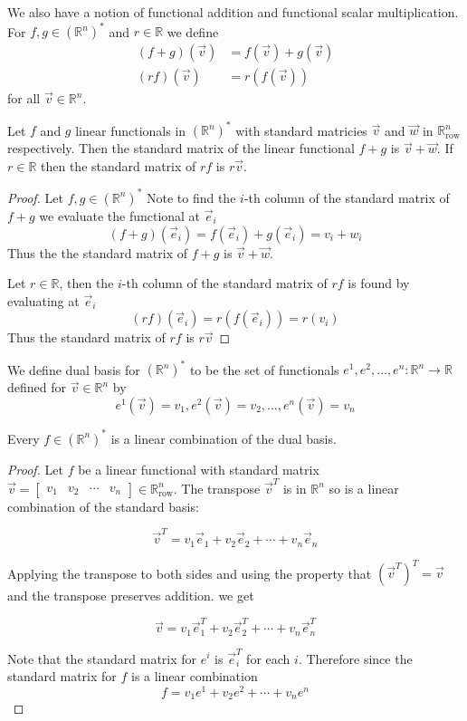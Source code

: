 \begin{definition}
We also have a notion of functional addition and functional scalar multiplication. For $f,g \in \left(\mathbb{R}^n\right)^*$ and $r \in \mathbb{R}$ we define
\begin{align*}
(f+g)(\vec{v})&=f(\vec{v})+g(\vec{v}) \\
(rf)(\vec{v})&=r(f(\vec{v}))
\end{align*}
for all $\vec{v} \in \mathbb{R}^n$.
\end{definition}

\begin{proposition}
Let $f$ and $g$ linear functionals in  $\left(\mathbb{R}^n\right)^*$ with standard matricies $\vec{v}$ and $\vec{w}$ in $\mathbb{R}^n_\text{row}$ respectively. Then 
the standard matrix of the linear functional $f+g$ is $\vec{v}+\vec{w}$. If $r \in \mathbb{R}$ then the standard matrix of $rf$ is $r\vec{v}$.
\end{proposition}
\begin{proof}
Let $f,g \in \left(\mathbb{R}^n\right)^*$
Note to find the $i$-th column of the standard matrix of $f+g$ we evaluate the functional at $\vec{e}_i$
\[
(f+g)(\vec{e}_i)=f(\vec{e}_i)+g(\vec{e}_i)=v_i+w_i
\]
Thus the the standard matrix of $f+g$ is $\vec{v}+\vec{w}$.

Let $r \in \mathbb{R}$, then the $i$-th column of the standard matrix of $rf$ is found by evaluating at $\vec{e}_i$
\[
(rf)(\vec{e}_i)=r(f(\vec{e}_i))=r(v_i)
\]
Thus the standard matrix of $rf$ is $r\vec{v}$
\end{proof}

\begin{definition}
We define dual basis for $\left(\mathbb{R}^n\right)^*$ to be the set of functionals $e^1,e^2,\ldots,e^n:\mathbb{R}^n \to \mathbb{R}$ defined for 
$\vec{v} \in \mathbb{R}^n$ by
\[
e^1(\vec{v})
=v_1,
e^2(\vec{v})
=v_2,
\ldots,
e^n(\vec{v})
=v_n
\]
\end{definition}

\begin{proposition}
Every $f \in \left(\mathbb{R}^n\right)^*$ is a linear combination of the dual basis.
\end{proposition}

\begin{proof}
Let $f$ be a linear functional with standard matrix $\vec{v}=\begin{bmatrix}v_1 & v_2 & \cdots & v_n\end{bmatrix} \in \mathbb{R}^n_\text{row}$. The transpose $\vec{v}^T$ is in $\mathbb{R}^n$ so is a linear combination of the standard basis:

\[
\vec{v}^T=v_1\vec{e}_1+v_2\vec{e}_2+\cdots+v_n\vec{e}_n
\]

Applying the transpose to both sides and using the property that $(\vec{v}^T)^T=\vec{v}$ and the transpose preserves addition. we get

\[
\vec{v}=v_1\vec{e}_1^T+v_2\vec{e}_2^T+\cdots+v_n\vec{e}_n^T
\]

Note that the standard matrix for $e^i$ is $\vec{e}_i^T$ for each $i$. Therefore since the standard matrix for $f$ is a linear combination 
\[
f=v_1e^1+v_2e^2+\cdots+v_ne^n
\]
\end{proof}


